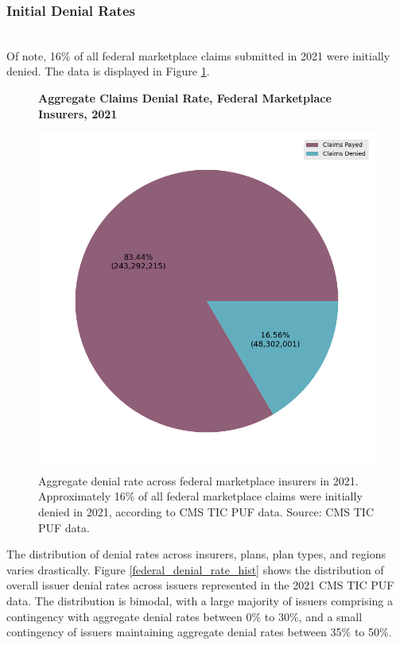 \documentclass[12pt, a4paper]{report}
\begin{document}
\subsubsection{Initial Denial Rates}
\hfill\\

Of note, 16\% of all federal marketplace claims submitted in 2021 were initially denied. The data is displayed in Figure \ref{federal_denial_rate}.\\

\begin{figure}
	\centering
	\textbf{Aggregate Claims Denial Rate, Federal Marketplace Insurers, 2021}\par\medskip
	\includegraphics[width=0.85\columnwidth]{images/cms_puf/overall_denial_pie.png}
	\caption{Aggregate denial rate across federal marketplace insurers in 2021. Approximately 16\% of all federal marketplace claims were initially denied in 2021, according to CMS TIC PUF data. Source: CMS TIC PUF data.}
	\label{federal_denial_rate}
\end{figure}


The distribution of denial rates across insurers, plans, plan types, and regions varies drastically. Figure \ref{federal_denial_rate_hist} shows the distribution of overall issuer denial rates across issuers represented in the 2021 CMS TIC PUF data. The distribution is bimodal, with a large majority of issuers comprising a contingency with aggregate denial rates between 0\% to 30\%, and a small contingency of issuers maintaining aggregate denial rates between 35\% to 50\%.
\end{document}
